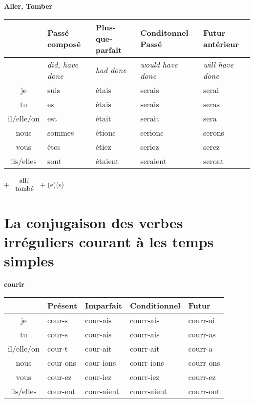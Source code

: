 \begin{flushleft}
\textbf{Aller, Tomber}
\vskip 0.1cm
\begin{tabular}{|c||L{2.5cm}|L{2.5cm}|L{2.5cm}|L{2.5cm}|}
\hline
& Pass\'e compos\'e & Plus-que-parfait & Conditonnel Pass\'e & Futur ant\'erieur \\
\hline
& \textit{did, have done} & \textit{had done} & \textit{would have done} & \textit{will have done} \\
\hline\hline
je            &	suis	&	\'etais	&	serais	 &	serai	\\
tu            &	es 	&	\'etais	&	serais	&	seras	\\
il/elle/on  &	est	&	\'etait	&	serait	&	sera	\\
nous       &	sommes	&	\'etions	&	serions	&	serons	\\
vous       &	\^etes	&	\'etiez	&	seriez		&	serez	\\
ils/elles   &	sont 	&	\'etaient	&	seraient	&	seront	\\
\hline
\end{tabular}
\;$+$
$\begin{array}{c}
\textnormal{all\'e}
\\
\textnormal{tomb\'e}
\end{array}$
$+$ (e)(s)
\end{flushleft}


\clearpage
\section{La conjugaison des verbes irr\'eguliers courant \`a les temps simples}
\setcounter{theorem}{0}
\setcounter{equation}{0}

\renewcommand{\stemPresent}{cour}
\renewcommand{\stemFutur}{courr}
\begin{center}
\textbf{courir}
\vskip 0.1cm
\begin{tabular}{|c||L{3cm}|L{3cm}|L{3cm}|L{3cm}|}
\hline
& Pr\'esent & Imparfait & Conditionnel & Futur \\
\hline\hline
je           &	\stemPresent-s 	&	\stemPresent-ais	&	\stemFutur-ais	 &	\stemFutur-ai	\\
tu           &	\stemPresent-s	&	\stemPresent-ais	&	\stemFutur-ais	&	\stemFutur-as	\\
il/elle/on &	\stemPresent-t	&	\stemPresent-ait	&	\stemFutur-ait	&	\stemFutur-a	\\
nous      &	\stemPresent-ons	&	\stemPresent-ions	&	\stemFutur-ions	&	\stemFutur-ons	\\
vous      &	\stemPresent-ez	&	\stemPresent-iez	&	\stemFutur-iez		&	\stemFutur-ez	\\
ils/elles  &	\stemPresent-ent	&	\stemPresent-aient	&	\stemFutur-aient	&	\stemFutur-ont	\\
\hline
\end{tabular}
\end{center}







